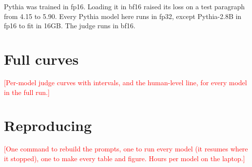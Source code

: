 \documentclass[10pt]{article}
\newcommand{\todo}[1]{\textcolor{red}{[#1]}}
\begin{document}
Pythia was trained in fp16. Loading it in bf16 raised its loss on a test paragraph from 4.15 to 5.90. Every Pythia model here runs in fp32, except Pythia-2.8B in fp16 to fit in 16GB. The judge runs in bf16.

\section{Full curves}
\label{app:curves}

\todo{Per-model judge curves with intervals, and the human-level line, for every model in the full run.}

\section{Reproducing}
\label{app:repro}

\todo{One command to rebuild the prompts, one to run every model (it resumes where it stopped), one to make every table and figure. Hours per model on the laptop.}
\end{document}
